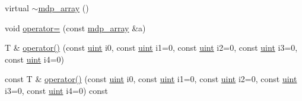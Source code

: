 \begin{DoxyCompactItemize}
virtual \hyperlink{classmdp__array_a962dc25e9c53d9f6e215b0ef952fc96b}{$\sim$mdp\_\-array} ()
\item 
void \hyperlink{classmdp__array_a8f439abc20da235f12cd5d0ab4d7b56b}{operator=} (const \hyperlink{classmdp__array}{mdp\_\-array} \&a)
\item 
T \& \hyperlink{classmdp__array_a9e3a7e699387fb78562fb8d9c9ebea57}{operator()} (const \hyperlink{mdp__global__vars_8h_a91ad9478d81a7aaf2593e8d9c3d06a14}{uint} i0, const \hyperlink{mdp__global__vars_8h_a91ad9478d81a7aaf2593e8d9c3d06a14}{uint} i1=0, const \hyperlink{mdp__global__vars_8h_a91ad9478d81a7aaf2593e8d9c3d06a14}{uint} i2=0, const \hyperlink{mdp__global__vars_8h_a91ad9478d81a7aaf2593e8d9c3d06a14}{uint} i3=0, const \hyperlink{mdp__global__vars_8h_a91ad9478d81a7aaf2593e8d9c3d06a14}{uint} i4=0)
\item 
const T \& \hyperlink{classmdp__array_a9ddceeb1b33b80495ef45afb812c0012}{operator()} (const \hyperlink{mdp__global__vars_8h_a91ad9478d81a7aaf2593e8d9c3d06a14}{uint} i0, const \hyperlink{mdp__global__vars_8h_a91ad9478d81a7aaf2593e8d9c3d06a14}{uint} i1=0, const \hyperlink{mdp__global__vars_8h_a91ad9478d81a7aaf2593e8d9c3d06a14}{uint} i2=0, const \hyperlink{mdp__global__vars_8h_a91ad9478d81a7aaf2593e8d9c3d06a14}{uint} i3=0, const \hyperlink{mdp__global__vars_8h_a91ad9478d81a7aaf2593e8d9c3d06a14}{uint} i4=0) const 
\end{DoxyCompactItemize}

